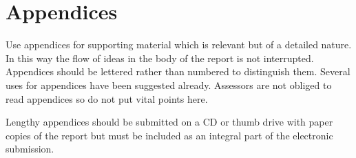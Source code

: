 \section{Appendices}

Use appendices for supporting material which is relevant but of a detailed
nature. In this way the flow of ideas in the body of the report is not
interrupted. Appendices should be lettered rather than numbered to distinguish
them. Several uses for appendices have been suggested already. Assessors are not
obliged to read appendices so do not put vital points here.

Lengthy appendices should be submitted on a CD or thumb drive with paper copies
of the report but must be included as an integral part of the electronic
submission.
